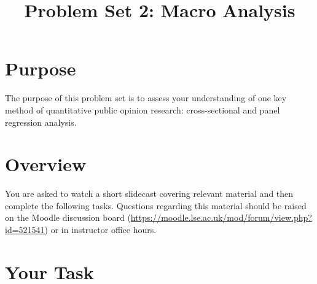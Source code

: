 \documentclass[a4paper]{exam}
\title{Problem Set 2: Macro Analysis}
\date{}
\begin{document}
\vspace{-4em}
\maketitle

\section{Purpose}\label{purpose}

The purpose of this problem set is to assess your understanding of one key method of quantitative public opinion research: cross-sectional and panel regression analysis.

\section{Overview}\label{overview}

You are asked to watch a short slidecast covering relevant material and then complete the following tasks. Questions regarding this material should be raised on the Moodle discussion board (\url{https://moodle.lse.ac.uk/mod/forum/view.php?id=521541}) or in instructor office hours.

\section{Your Task}\label{your-task}
\end{document}
